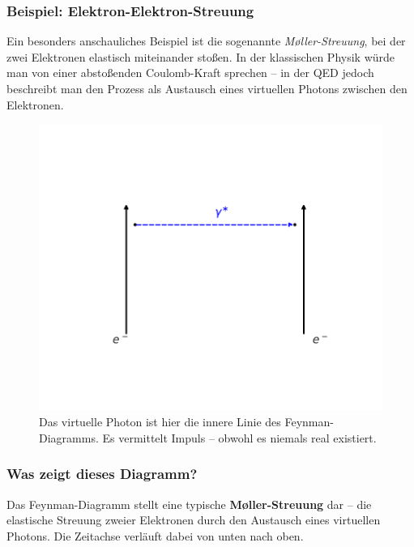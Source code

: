 \subsubsection*{Beispiel: Elektron-Elektron-Streuung}
Ein besonders anschauliches Beispiel ist die sogenannte \emph{Møller-Streuung}, bei der zwei Elektronen elastisch miteinander stoßen. In der klassischen Physik würde man von einer abstoßenden Coulomb-Kraft sprechen – in der QED jedoch beschreibt man den Prozess als Austausch eines virtuellen Photons zwischen den Elektronen.
\begin{figure}[H]
	\begin{center}
		\includegraphics[width=0.4\linewidth]{bilder/moeller-diagramm.pdf}
	\end{center}
	\caption{Das virtuelle Photon ist hier die innere Linie des Feynman-Diagramms. Es vermittelt Impuls – obwohl es niemals real existiert.}
\end{figure}

\subsubsection*{Was zeigt dieses Diagramm?}
Das Feynman-Diagramm stellt eine typische \textbf{Møller-Streuung} dar – die elastische Streuung zweier Elektronen durch den Austausch eines virtuellen Photons. Die Zeitachse verläuft dabei von unten nach oben.


